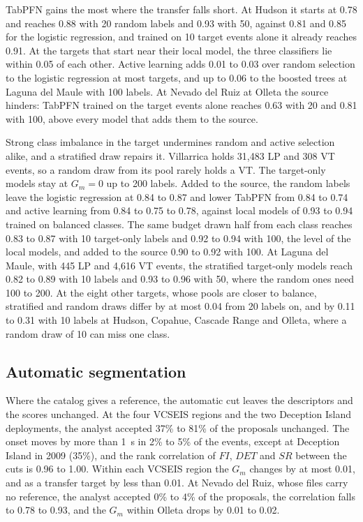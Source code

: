 \documentclass[pdflatex,sn-mathphys-num]{sn-jnl}
\begin{document}
TabPFN gains the most where the transfer falls short. At Hudson it starts
at 0.78 and reaches 0.88 with 20 random labels and 0.93 with 50, against
0.81 and 0.85 for the logistic regression, and trained on 10 target events
alone it already reaches 0.91. At the targets that start near their local
model, the three classifiers lie within 0.05 of each other. Active learning adds
0.01 to 0.03 over random selection to the logistic regression at most
targets, and up to 0.06 to the boosted trees at Laguna del Maule with 100
labels. At Nevado del Ruiz at Olleta the source hinders: TabPFN trained on
the target events alone reaches 0.63 with 20 and 0.81 with 100, above every
model that adds them to the source.

Strong class imbalance in the target undermines random and active
selection alike, and a stratified draw repairs it. Villarrica holds 31{,}483 LP and 308 VT events, so a random draw from its
pool rarely holds a VT. The target-only models stay at $G_m = 0$ up to 200
labels. Added to the source, the random labels leave the logistic
regression at 0.84 to 0.87 and lower TabPFN from 0.84 to 0.74 and active
learning from 0.84 to 0.75 to 0.78, against local models of 0.93 to 0.94
trained on balanced classes. The
same budget drawn half from each class reaches 0.83 to 0.87 with 10
target-only labels and 0.92 to 0.94 with 100, the level of the local models,
and added to the source 0.90 to 0.92 with 100. At Laguna del Maule, with 445
LP and 4{,}616 VT events, the stratified target-only models reach 0.82 to
0.89 with 10 labels and 0.93 to 0.96 with 50, where the random ones need 100
to 200. At the eight other targets, whose pools are closer to balance,
stratified and random draws differ by at most 0.04 from 20 labels on, and by
0.11 to 0.31 with 10 labels at Hudson, Copahue, Cascade Range and Olleta,
where a random draw of 10 can miss one class.

\subsection{Automatic segmentation}\label{subsec:res_autocut}

Where the catalog gives a reference, the automatic cut leaves the descriptors
and the scores unchanged. At the four VCSEIS regions and the two Deception Island deployments, the
analyst accepted 37\% to 81\% of the proposals unchanged. The onset moves by
more than 1~s in 2\% to 5\% of the events, except at Deception Island in
2009 (35\%), and the rank correlation of $FI$, $DET$ and $SR$ between the
cuts is 0.96 to 1.00. Within each VCSEIS region the $G_m$ changes by at most
0.01, and as a transfer target by less than 0.01. At Nevado del Ruiz, whose
files carry no reference, the analyst accepted 0\% to 4\% of the proposals,
the correlation falls to 0.78 to 0.93, and the $G_m$ within Olleta drops by
0.01 to 0.02.
\end{document}
